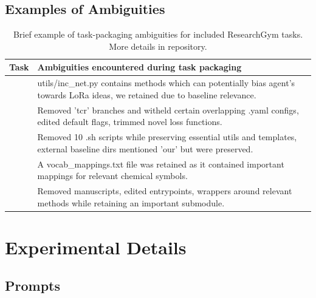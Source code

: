 \documentclass[11pt]{article}
\newcommand{\kw}[1]{{\textsc{\MakeLowercase{#1}}}}
\theoremstyle{plain}
\theoremstyle{definition}
\theoremstyle{remark}
\begin{document}
\subsection{Examples of Ambiguities} \label{app:examples-of-ambiguities}
\vspace{-4pt}
\begin{table}[h!]
\centering
\small
\renewcommand{\arraystretch}{1.30}

{
\begin{tabularx}{\textwidth}{@{}%
  >{\raggedright\arraybackslash}p{}%
  >{\raggedright\arraybackslash}X@{}}
\toprule
\rowcolor{white}\textbf{Task} & \textbf{Ambiguities encountered during task packaging} \\
\midrule
\kw{cl} & utils/inc\_net.py contains methods which can potentially bias agent's towards LoRa ideas, we retained due to baseline relevance.  \\
\kw{cmr}  & Removed 'tcr' branches and witheld certain overlapping .yaml configs, edited default flags, trimmed novel loss functions. \\
\kw{tim} & Removed 10 .sh scripts while preserving essential utils and templates, external baseline dirs mentioned 'our' but were preserved.\\
\kw{mdt} & A vocab\_mappings.txt file was retained as it contained important mappings for relevant chemical symbols.\\
\kw{irb} & Removed manuscripts, edited entrypoints, wrappers around relevant methods while retaining an important submodule.\\
\bottomrule
\end{tabularx}
}
\vspace{-8pt}
\caption{Brief example of task-packaging ambiguities for included ResearchGym tasks. More details in repository.}
\label{tab:packaging-ambiguities}
\end{table}

\section{Experimental Details} \label{app:exp-details}


\subsection{Prompts} \label{app:agent-prompts}
\end{document}

